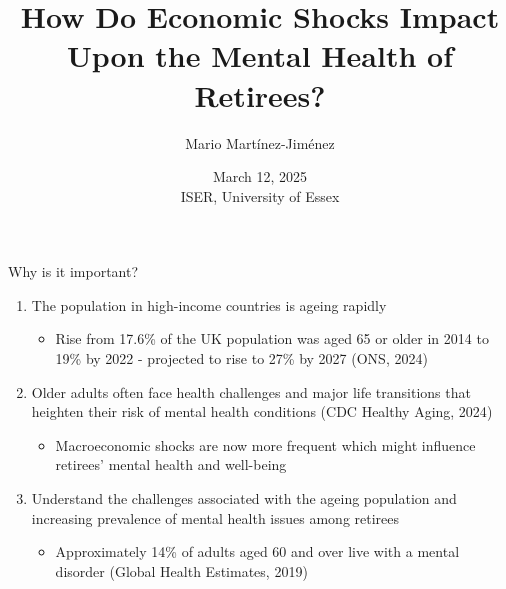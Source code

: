 \documentclass{beamer}
\title[Economic Shocks, Retirement \& Mental Health]{How Do Economic Shocks Impact Upon the Mental Health of Retirees?}
\author{Mario Martínez-Jiménez}
\institute{Imperial College Business School}
\date{\footnotesize March 12, 2025\\
\vspace{0.45cm}
ISER, University of Essex}
\begin{document}
\begin{frame}
\thispagestyle{empty}  %
  \titlepage
\end{frame}


\small
\begin{frame}{Why is it important?}
\footnotesize
\begin{enumerate}
\footnotesize
\item<1-> The population in high-income countries is \begingroup\color{Blue}ageing rapidly \endgroup

 \begin{itemize}
 \scriptsize
    \item 	Rise from 17.6\% of the UK population was aged 65 or older in 2014 to 19\% by 2022 - projected to rise to 27\% by 2027 (\begingroup\color{lightgray}ONS, 2024\endgroup)
\end{itemize}

\vspace{0.3cm}

\item<2->	Older adults often face \begingroup\color{Blue}health challenges \endgroup and major life transitions that heighten their risk of mental health conditions  \scriptsize{(\begingroup\color{lightgray}CDC Healthy Aging, 2024\endgroup)}

 \begin{itemize}
 \scriptsize
    \item 	\begingroup\color{Blue}Macroeconomic shocks  \endgroup are now more frequent which might influence retirees' mental health and well-being 
\end{itemize}

\vspace{0.3cm}

\item<3-> Understand the challenges associated with the ageing population and  \begingroup\color{Blue}increasing prevalence of mental health \endgroup issues among retirees 

\begin{itemize}
 \scriptsize
    \item 	Approximately 14\% of adults aged 60 and over live with a \begingroup\color{Blue}mental disorder  \endgroup \scriptsize{(\begingroup\color{lightgray}Global Health Estimates, 2019\endgroup)}
\end{itemize}


\end{enumerate}

\end{frame}
\end{document}
